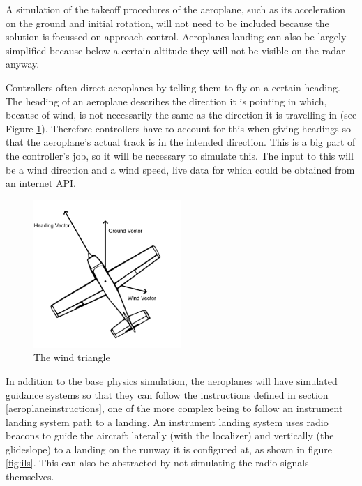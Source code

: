 \documentclass{article}
\begin{document}
A simulation of the takeoff procedures of the aeroplane, such as its acceleration on the ground and initial rotation, will not need to be included because the solution is focussed on approach control.
Aeroplanes landing can also be largely simplified because below a certain altitude they will not be visible on the radar anyway.

Controllers often direct aeroplanes by telling them to fly on a certain heading.
The heading of an aeroplane describes the direction it is pointing in which, because of wind, is not necessarily the same as the direction it is travelling in (see Figure \ref{fig:windtriangle}).
Therefore controllers have to account for this when giving headings so that the aeroplane's actual track is in the intended direction.
This is a big part of the controller's job, so it will be necessary to simulate this.
The input to this will be a wind direction and a wind speed, live data for which could be obtained from an internet API.

\begin{figure}[H]
\centering
\includegraphics[width=0.5\textwidth]{diagrams/windtriangle.png}
\caption{\label{fig:windtriangle}The wind triangle}
\end{figure}

In addition to the base physics simulation, the aeroplanes will have simulated guidance systems so that they can follow the instructions defined in section \ref{aeroplaneinstructions}, one of the more complex being to follow an instrument landing system path to a landing.
An instrument landing system uses radio beacons to guide the aircraft laterally (with the localizer) and vertically (the glideslope) to a landing on the runway it is configured at, as shown in figure \ref{fig:ils}.
This can also be abstracted by not simulating the radio signals themselves.
\end{document}

